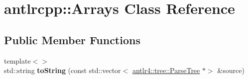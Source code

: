 \hypertarget{classantlrcpp_1_1Arrays}{}\section{antlrcpp\+:\+:Arrays Class Reference}
\label{classantlrcpp_1_1Arrays}
\subsection*{Public Member Functions}
\begin{DoxyCompactItemize}
\item 
\mbox{\label{classantlrcpp_1_1Arrays_a7c34152170f8af54195d58b22b556f80}} 
{\footnotesize template$<$$>$ }\\std\+::string {\bfseries to\+String} (const std\+::vector$<$ \hyperlink{classantlr4_1_1tree_1_1ParseTree}{antlr4\+::tree\+::\+Parse\+Tree} $\ast$$>$ \&source)
\end{DoxyCompactItemize}
